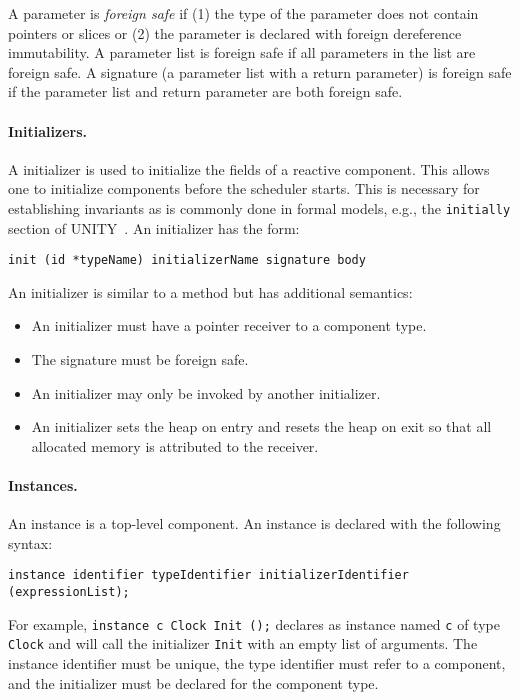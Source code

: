 A parameter is \emph{foreign safe} if (1) the type of the parameter does not contain pointers or slices or (2) the parameter is declared with foreign dereference immutability.
A parameter list is foreign safe if all parameters in the list are foreign safe.
A signature (a parameter list with a return parameter) is foreign safe if the parameter list and return parameter are both foreign safe.

\paragraph{Initializers.}
A initializer is used to initialize the fields of a reactive component.
This allows one to initialize components before the scheduler starts.
This is necessary for establishing invariants as is commonly done in formal models, e.g., the \verb+initially+ section of UNITY~\cite{chandy1989parallel}.
An initializer has the form:
\begin{verbatim}
init (id *typeName) initializerName signature body
\end{verbatim}
An initializer is similar to a method but has additional semantics:
\begin{itemize}
\item An initializer must have a pointer receiver to a component type.
\item The signature must be foreign safe.
\item An initializer may only be invoked by another initializer.
\item An initializer sets the heap on entry and resets the heap on exit so that all allocated memory is attributed to the receiver.
\end{itemize}

\paragraph{Instances.}
An instance is a top-level component.
An instance is declared with the following syntax:
\begin{verbatim}
instance identifier typeIdentifier initializerIdentifier (expressionList);
\end{verbatim}
For example, \verb+instance c Clock Init ();+ declares as instance named \verb+c+ of type \verb+Clock+ and will call the initializer \verb+Init+ with an empty list of arguments.
The instance identifier must be unique, the type identifier must refer to a component, and the initializer must be declared for the component type.

